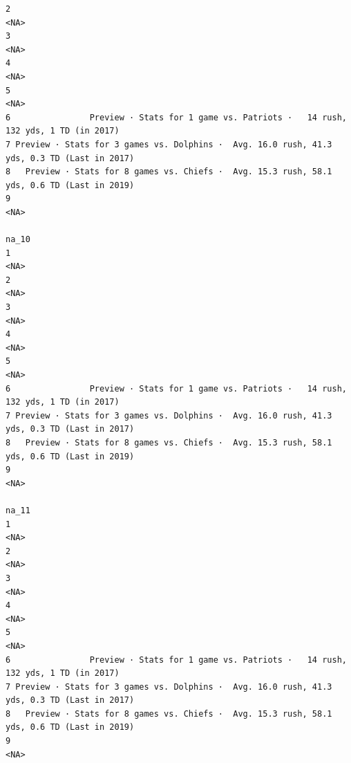 \documentclass[
]{article}
\begin{document}
\begin{verbatim}
2                                                                                        <NA>
3                                                                                        <NA>
4                                                                                        <NA>
5                                                                                        <NA>
6                Preview · Stats for 1 game vs. Patriots ·   14 rush, 132 yds, 1 TD (in 2017)
7 Preview · Stats for 3 games vs. Dolphins ·  Avg. 16.0 rush, 41.3 yds, 0.3 TD (Last in 2017)
8   Preview · Stats for 8 games vs. Chiefs ·  Avg. 15.3 rush, 58.1 yds, 0.6 TD (Last in 2019)
9                                                                                        <NA>
                                                                                        na_10
1                                                                                        <NA>
2                                                                                        <NA>
3                                                                                        <NA>
4                                                                                        <NA>
5                                                                                        <NA>
6                Preview · Stats for 1 game vs. Patriots ·   14 rush, 132 yds, 1 TD (in 2017)
7 Preview · Stats for 3 games vs. Dolphins ·  Avg. 16.0 rush, 41.3 yds, 0.3 TD (Last in 2017)
8   Preview · Stats for 8 games vs. Chiefs ·  Avg. 15.3 rush, 58.1 yds, 0.6 TD (Last in 2019)
9                                                                                        <NA>
                                                                                        na_11
1                                                                                        <NA>
2                                                                                        <NA>
3                                                                                        <NA>
4                                                                                        <NA>
5                                                                                        <NA>
6                Preview · Stats for 1 game vs. Patriots ·   14 rush, 132 yds, 1 TD (in 2017)
7 Preview · Stats for 3 games vs. Dolphins ·  Avg. 16.0 rush, 41.3 yds, 0.3 TD (Last in 2017)
8   Preview · Stats for 8 games vs. Chiefs ·  Avg. 15.3 rush, 58.1 yds, 0.6 TD (Last in 2019)
9                                                                                        <NA>

\end{verbatim}
\end{document}
